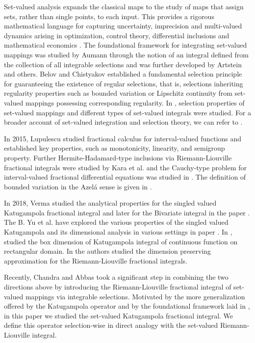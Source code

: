 \documentclass{amsproc}
\theoremstyle{definition}
\theoremstyle{remark}
\numberwithin{equation}{section}
\begin{document}
Set-valued analysis expands the classical maps to the study of maps that assign sets, rather than single points, to each input. This provides a rigorous mathematical language for capturing uncertainty, imprecision and multi-valued dynamics arising in optimization, control theory, differential inclusions and mathematical economics \cite{Kisie, Levin, Michta1}. The foundational framework for integrating set-valued mappings was studied by Aumann \cite{Aumann} through the notion of an integral defined from the collection of all integrable selections and was further developed by Artstein \cite{Artstein} and others. Belov and Chistyakov \cite{Belov} established a fundamental selection principle for guaranteeing the existence of regular selections, that is, selections inheriting regularity properties such as bounded variation or Lipschitz continuity from set-valued mappings possessing corresponding regularity. In \cite{Michta}, selection properties of set-valued mappings and different types of set-valued integrals were studied. For a broader account of set-valued integration and selection theory, we can refer to \cite{Aubin1, Aubin2}. 

In 2015, Lupulescu \cite{Lupulescu} studied fractional calculus for interval-valued functions and established key properties, such as monotonicity, linearity, and semigroup property. Further Hermite-Hadamard-type inclusions via Riemann-Liouville fractional integrals were studied by Kara et al. \cite{Kara} and the Cauchy-type problem for interval-valued fractional differential equations was studied in \cite{Shen}. The definition of bounded variation in the Azel\'a sense is given in \cite{Clarkson}. %

In 2018, Verma \cite{Verma2}  studied the analytical properties for the singled valued Katugampola fractional integral and later for the Bivariate integral in the paper \cite{Verma}. The B. Yu et al. have explored the various properties of the singled valued Katugampola and its dimensional analysis in various settings in paper \cite{Yu,Yu2,Yu3,Yu4}. In \cite{Chandra22}, studied the box dimension of Katugampola integral of continuous function on rectangular domain. In \cite{Agrawal} the authors studied the dimension preserving approximation for the Riemann-Liouville fractional integrals. 


Recently, Chandra and Abbas \cite{Chandra25} took a significant step in combining the two directions above by introducing the Riemann-Liouville fractional integral of set-valued mappings via integrable selections. Motivated by the more generalization offered by the Katugampola operator \cite{Katu1,Katu2} and by the foundational framework laid in \cite{Aubin2}, in this paper we studied the set-valued Katugampola fractional integral. We define this operator selection-wise in direct analogy with the set-valued Riemann-Liouville integral.
\end{document}
